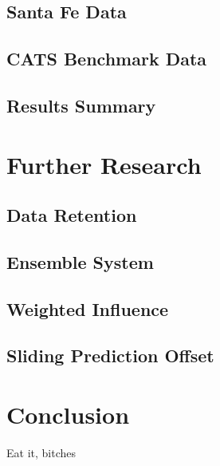 \documentclass[10pt]{article}
\begin{document}
\subsection{Santa Fe Data}


\subsection{CATS Benchmark Data}


\subsection{Results Summary}


\section{Further Research}

\subsection{Data Retention}


\subsection{Ensemble System}




\subsection{Weighted Influence}

\subsection{ Sliding Prediction Offset }


\section{Conclusion}
Eat it, bitches


\nocite{Moreno03}



\end{document}
